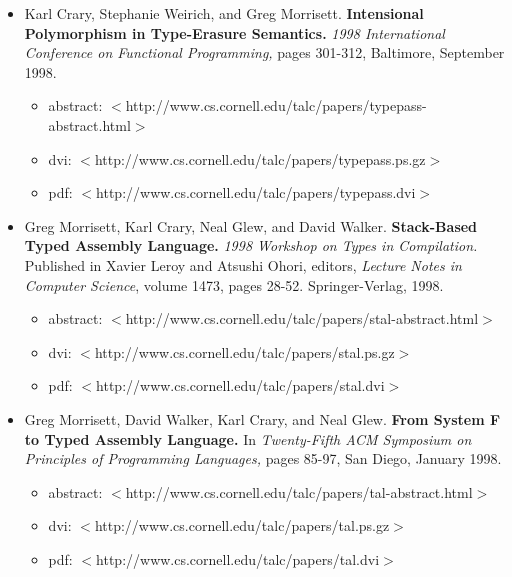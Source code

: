 \documentclass[titlepage,10pt]{article}
\begin{document}
\begin{itemize}
\item Karl Crary, Stephanie Weirich, and Greg Morrisett.
\textbf{Intensional Polymorphism in Type-Erasure Semantics.}
\textit{1998 International Conference on Functional Programming,} pages
301-312, Baltimore, September 1998.

    \begin{itemize}
    \item abstract: $<$http://www.cs.cornell.edu/talc/papers/typepass-abstract.html$>$
    \item dvi: $<$http://www.cs.cornell.edu/talc/papers/typepass.ps.gz$>$
    \item pdf: $<$http://www.cs.cornell.edu/talc/papers/typepass.dvi$>$
    \end{itemize}

\item Greg Morrisett, Karl Crary, Neal Glew, and David Walker.
\textbf{Stack-Based Typed Assembly Language.} \textit{1998 Workshop on
Types in Compilation.} Published in Xavier Leroy and Atsushi Ohori,
editors, \textit{Lecture Notes in Computer Science}, volume 1473, pages
28-52. Springer-Verlag, 1998.

    \begin{itemize}
    \item abstract: $<$http://www.cs.cornell.edu/talc/papers/stal-abstract.html$>$
    \item dvi: $<$http://www.cs.cornell.edu/talc/papers/stal.ps.gz$>$
    \item pdf: $<$http://www.cs.cornell.edu/talc/papers/stal.dvi$>$
    \end{itemize}

\item Greg Morrisett, David Walker, Karl Crary, and Neal Glew.
\textbf{From System F to Typed Assembly Language.} In
\textit{Twenty-Fifth ACM Symposium on Principles of Programming
Languages,} pages 85-97, San Diego, January 1998.

    \begin{itemize}
    \item abstract: $<$http://www.cs.cornell.edu/talc/papers/tal-abstract.html$>$
    \item dvi: $<$http://www.cs.cornell.edu/talc/papers/tal.ps.gz$>$
    \item pdf: $<$http://www.cs.cornell.edu/talc/papers/tal.dvi$>$
    \end{itemize}

\end{itemize}
\end{document}
